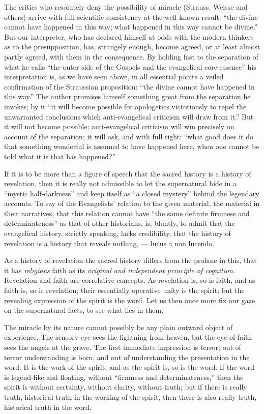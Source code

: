 \documentclass[12pt,a4paper,openany]{book}
\newcommand{\opage}[1]{\marginnote{\footnotesize\textit{[#1]}}}
\begin{document}
The critics who resolutely deny the possibility of miracle
(Strauss, Weisse and others) arrive with full scientific
consistency at the well-known result:
``the divine cannot have happened in this way; what
happened in this way cannot be divine.'' But our
interpreter, who has declared himself at odds with the modern thinkers
as to the presupposition, has, strangely enough, become
agreed, or at least almost partly agreed, with them in the consequence.
By holding fast to the separation of what he calls
``the outer side of the Gospels and the evangelical core-essence''
his interpretation is, as we have seen above,
in all essential points a veiled confirmation
of the Straussian proposition: ``the divine cannot
have happened in this way.'' The author promises himself something
great from the separation he invokes; by it ``it will
become possible for apologetics victoriously to repel the unwarranted
conclusions which anti-evangelical criticism will
draw from it.'' But it will not become possible; anti-evangelical
criticism will win precisely on account of the separation;
it will ask, and with full right: ``what good
\setcounter{footnote}{0}%
\opage{319}does it do that something wonderful is assumed to have happened here,
when one cannot be told what it is
that has happened?''

If it is to be more than a figure of speech that the sacred
history is a history of revelation, then it is
really not admissible to let the supernatural hide in
a ``mystic half-darkness'' and keep itself as ``a closed
mystery'' behind the legendary accounts. To say
of the Evangelists' relation to the given material, the material in
their narratives, that this relation cannot have ``the same
definite firmness and determinateness'' as that of other historians,
is, bluntly, to admit that the evangelical
history, strictly speaking, lacks credibility, that the history of revelation
is a history that reveals nothing, ---
lucus a non lucendo.

As a history of revelation the sacred history
differs from the profane in this, that it has \emph{religious}
faith as its \emph{original and independent principle of cognition.} Revelation and faith are correlative concepts.
As revelation is, so is faith, and as
faith is, so is revelation; their essentially operative
unity is the spirit; but the revealing expression of the spirit
is the word. Let us then once more fix our gaze on the supernatural
facts, to see what lies in them.

The miracle by its nature cannot possibly be any
plain outward object of experience. The sensory
eye sees the lightning from heaven, but the eye of faith sees
the angels at the grave. The first immediate impression
is terror; out of terror understanding is born,
and out of understanding the presentation in the word. It is
the work of the spirit, and as the spirit is, so is the word.
\setcounter{footnote}{0}%
\opage{320}If the word is legend-like and floating, without ``firmness and determinateness,''
then the spirit is without certainty, without clarity,
without truth; but if there is really truth,
historical truth in the working of the spirit, then there is also
really truth, historical truth in the word.
\end{document}
